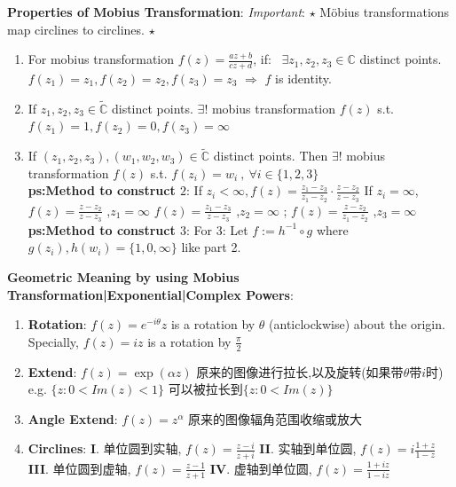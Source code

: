\documentclass[9pt]{article}
\begin{document}
\textbf{Properties of Mobius Transformation}: \textit{Important}: $\star$ Möbius transformations map circlines to circlines. $\star$
\begin{enumerate}[itemsep=-2pt, topsep=-2pt]
    \item For mobius transformation $f(z)=\frac{az+b}{cz+d}$, if: \ $\exists z_1,z_2,z_3\in\mathbb{C}$ distinct points. $f(z_1)=z_1,f(z_2)=z_2,f(z_3)=z_3$ $\Rightarrow$ $f$ is identity.
    \item If $z_1,z_2,z_3\in\widetilde{\mathbb{C}}$ distinct points. \quad $\exists!$ mobius transformation $f(z)$ s.t. $f(z_1)=1,f(z_2)=0,f(z_3)=\infty$
    \item If $(z_1,z_2,z_3),(w_1,w_2,w_3)\in\widetilde{\mathbb{C}}$ distinct points. Then $\exists!$ mobius transformation $f(z)$ s.t. $f(z_i)=w_i \ , \ \forall i\in\{1,2,3\}$ \\
    \textbf{ps:Method to construct $2$}: If $z_i<\infty,f(z)=\frac{z_1-z_3}{z_1-z_2}\cdot\frac{z-z_2}{z-z_3}$ \qquad If $z_i=\infty$, {\footnotesize $f(z)=\frac{z-z_2}{z-z_3}$ {\scriptsize ,$z_1=\infty$} $f(z)=\frac{z_1-z_3}{z-z_3}$ {\scriptsize ,$z_2=\infty$} ; $f(z)=\frac{z-z_2}{z_1-z_2}$ {\scriptsize ,$z_3=\infty$} } \\
    \textbf{ps:Method to construct $3$}: For 3: Let $f:=h^{-1}\circ g$ {\footnotesize where $g(z_i),h(w_i)=\{1,0,\infty\}$ like part 2.}
    \vspace{1.5pt}
\end{enumerate}

\textbf{Geometric Meaning by using Mobius Transformation|Exponential|Complex Powers}:

\begin{enumerate}[itemsep=-2pt, topsep=-2pt]
    \item \textbf{Rotation}: $f(z)=e^{-i\theta}z$ is a rotation by $\theta$ (anticlockwise) about the origin. \qquad Specially, $f(z)=iz$ is a rotation by $\frac{\pi}{2}$
    \item \textbf{Extend}: $f(z)=\exp(\alpha z)$ {\small 原来的图像进行拉长,以及旋转(如果带$\theta$带$i$时)} e.g. $\{z:0<Im(z)<1\}$ {\small 可以被拉长到$\{z:0<Im(z)\}$}
    \item \textbf{Angle Extend}: $f(z)=z^{\alpha}$ {\small 原来的图像辐角范围收缩或放大}
    \item \textbf{Circlines}: {\small \textbf{I}. 单位圆到实轴, $f(z)=\frac{z-i}{z+i}$ \quad \textbf{II}. 实轴到单位圆, $f(z)=i\frac{1+z}{1-z}$ \textbf{III}. 单位圆到虚轴, $f(z)=\frac{z-1}{z+1}$ \quad \textbf{IV}. 虚轴到单位圆, $f(z)=\frac{1+iz}{1-iz}$}
\end{enumerate} 
\end{document}
